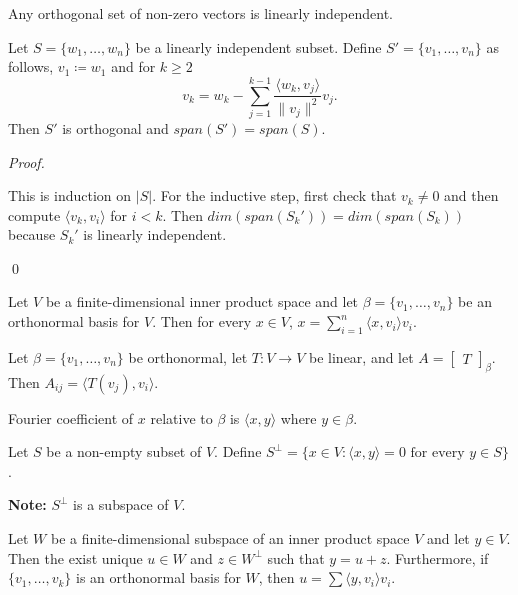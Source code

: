 \documentclass[12pt]{article}
\newenvironment{theorem}[2][Theorem]{\begin{trivlist}
\item[\hskip \labelsep {\bfseries #1}\hskip \labelsep {\bfseries #2.}]}{\end{trivlist}}
\newenvironment{corollary}[2][Corollary]{\begin{trivlist}
\item[\hskip \labelsep {\bfseries #1}\hskip \labelsep {\bfseries #2}]}{\end{trivlist}}
\newenvironment{definition}[2][Definition]{\begin{trivlist}
\item[\hskip \labelsep {\bfseries #1}\hskip \labelsep {\bfseries #2}]}{\end{trivlist}}
\newenvironment{sol}
    {\emph{Proof.}
    }
    {
    \qed
    }
\begin{document}
\begin{corollary}{4}
Any orthogonal set of non-zero vectors is linearly independent.
\end{corollary}

\begin{theorem}{6.4 (Graham-Schmidt algorithm)} Let $S = \{w_1, \dots, w_n\}$ be a linearly independent subset. Define $S' = \{v_1, \dots, v_n\}$ as follows, $v_1 \coloneqq w_1$ and for $k \geq 2$ $$v_k = w_k - \sum_{j = 1}^{k-1}\frac{\langle w_k, v_j \rangle}{\lVert v_j \rVert^2}v_j.$$ Then $S'$ is orthogonal and $span(S') = span(S)$.
\end{theorem}

\begin{sol}
This is induction on $\lvert S \rvert$. For the inductive step, first check that $v_k \neq 0$ and then compute $\langle v_k, v_i \rangle$ for $i < k$. Then $dim(span(S_k')) = dim(span(S_k))$ because $S_k'$ is linearly independent. 
\end{sol}

\begin{theorem}{6.5}
Let $V$ be a finite-dimensional inner product space and let $\beta = \{v_1, \dots, v_n\}$ be an orthonormal basis for $V$. Then for every $x \in V$, $x = \sum_{i = 1}^n \langle x, v_i \rangle v_i$.
\end{theorem}

\begin{corollary}{7}
Let $\beta = \{v_1, \dots, v_n\}$ be orthonormal, let $T : V \to V$ be linear, and let $A = \begin{bmatrix}
T
\end{bmatrix}_\beta$. Then $A_{ij} = \langle T(v_j), v_i \rangle$. 
\end{corollary}

\noindent Fourier coefficient of $x$ relative to $\beta$ is $\langle x, y \rangle$ where $y \in \beta$.

\begin{definition}{6}
Let $S$ be a non-empty subset of $V$. Define $S^\perp = \{x \in V : \langle x, y \rangle = 0 \text{ for every } y \in S\}$.
\end{definition}

\noindent\textbf{Note:} $S^\perp$ is a subspace of $V$.

\begin{theorem}{6.6}
Let $W$ be a finite-dimensional subspace of an inner product space $V$ and let $y \in V$. Then the exist unique $u \in W$ and $z \in W^\perp$ such that $y = u + z$. Furthermore, if $\{v_1, \dots, v_k\}$ is an orthonormal basis for $W$, then $u = \sum \langle y, v_i \rangle v_i$. 
\end{theorem}
\end{document}
